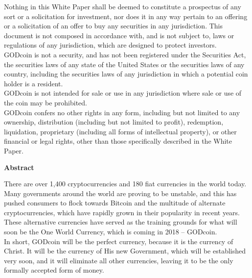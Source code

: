\documentclass[12pt,a4paper]{article}
\begin{document}
  Nothing in this White Paper shall be deemed to constitute a prospectus of any sort or a solicitation for investment, nor does it in any way pertain to an offering or a solicitation of an offer to buy any securities in any jurisdiction. This document is not composed in accordance with, and is not subject to, laws or regulations of any jurisdiction, which are designed to protect investors.\\

  GODcoin is not a security, and has not been registered under the Securities Act, the securities laws of any state of the United States or the securities laws of any country, including the securities laws of any jurisdiction in which a potential coin holder is a resident.\\

  GODcoin is not intended for sale or use in any jurisdiction where sale or use of the coin may be prohibited.\\

  GODcoin confers no other rights in any form, including but not limited to any ownership, distribution (including but not limited to profit), redemption, liquidation, proprietary (including all forms of intellectual property), or other financial or legal rights, other than those specifically described in the White Paper.

  \newpage
  \begin{center}
    \Large{\textbf{Abstract}}
  \end{center}
  \setlength{\parindent}{0pt}
  \vspace{3mm}
  \vspace{3mm}

  There are over 1,400 cryptocurrencies and 180 fiat currencies in
  the world today. Many governments around the world are proving to be
  unstable, and this has pushed consumers to flock towards Bitcoin and the
  multitude of alternate cryptocurrencies, which have rapidly grown in their
  popularity in recent years. These alternative currencies have served as the
  training grounds for what will soon be the One World Currency, which is
  coming in 2018 – GODcoin.\\

  In short, GODcoin will be the perfect currency, because it is the currency
  of Christ. It will be the currency of His new Government, which will be
  established very soon, and it will eliminate all other currencies, leaving
  it to be the only formally accepted form of money.\\
\end{document}

